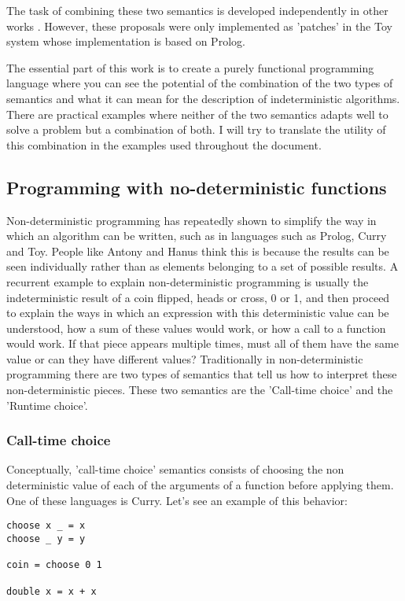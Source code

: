 \documentclass[class=article, crop=false]{standalone}
\begin{document}
The task of combining these two semantics is developed independently in other works
\cite{riesco2014singular}. However, these proposals were only implemented as 'patches' in the
Toy system whose implementation is based on Prolog.

The essential part of this work is to create a purely functional programming language where
you can see the potential of the combination of the two types of semantics and what it can
mean for the description of indeterministic algorithms. There are practical examples where
neither of the two semantics adapts well to solve a problem but a combination of both. I will
try to translate the utility of this combination in the examples used throughout the
document.

\subsection{Programming with no-deterministic functions}

Non-deterministic programming has repeatedly shown to simplify the way in which an algorithm
can be written, such as in languages such as Prolog, Curry and Toy. People like Antony and
Hanus think this is because the results can be seen individually rather than as elements
belonging to a set of possible results\cite{antoy2010functional}. A recurrent example to
explain non-deterministic programming is usually the indeterministic result of a coin
flipped, heads or cross, 0 or 1, and then proceed to explain the ways in which an expression
with this deterministic value can be understood, how a sum of these values would work, or how
a call to a function would work. If that piece appears multiple times, must all of them have
the same value or can they have different values? Traditionally in non-deterministic
programming there are two types of semantics that tell us how to interpret these
non-deterministic pieces. These two semantics are the 'Call-time choice' and the 'Runtime
choice'.

\subsubsection{Call-time choice}

Conceptually, 'call-time choice' semantics consists of choosing the non deterministic value
of each of the arguments of a function before applying them\cite{fischer2011purely}. One of
these languages is Curry. Let's see an example of this behavior:

\begin{verbatim}
choose x _ = x
choose _ y = y

coin = choose 0 1

double x = x + x
\end{verbatim}
\end{document}
